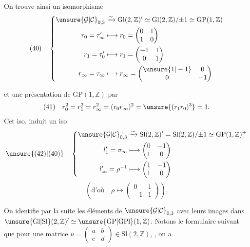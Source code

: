 On trouve ainsi un isomorphisme
\[
(40)\quad\left\{\begin{aligned}
\unsure{\mathcal{G}|\mathcal{C}}_{0,3}&\xrightarrow{\sim}\mathrm{Gl}(2,\mathbb Z)'\simeq
\mathrm{Gl}(2,\mathbb Z)/\mathord{\pm}1\simeq\mathrm{GP}(1,\mathbb Z)\\
r_0=\tau'_\infty&\longmapsto r_0=\begin{pmatrix}0&1\\1&0\end{pmatrix}\\
r_1=\tau'_0&\longmapsto r_1=\begin{pmatrix}-1&1\\0&1\end{pmatrix}\\
r_\infty=\tau_\infty&\longmapsto r_\infty=\begin{pmatrix}\unsure{1|-1}&0\\0&-1\end{pmatrix}
\end{aligned}\right.
\]

et une présentation de $\mathrm{GP}(1,\mathbb Z)$ par
\[
(41)\quad r_0^2=r_1^2=r_\infty^2=(r_0r_\infty)^2=\unsure{(r_1r_0)^3}=1.
\]
Cet iso. induit un iso
\[
\unsure{(42)|(40)}\quad\left\{\begin{aligned}
\unsure{\mathcal{G}|\mathcal{C}}_{0,3}^{+}&\xrightarrow{\sim}
\mathrm{Sl}(2,\mathbb Z)'=\mathrm{Sl}(2,\mathbb Z)/\mathord{\pm}1
\simeq\mathrm{GP}(1,\mathbb Z)^{+}\\
l'_1=\sigma_\infty&\longmapsto\begin{pmatrix}0&-1\\1&0\end{pmatrix}\\
l'_\infty=\rho^{-1}&\longmapsto\begin{pmatrix}1&-1\\1&0\end{pmatrix}
\end{aligned}\right.
\]
\[
(\text{d'où}\quad\rho\longmapsto\begin{pmatrix}0&1\\-1&1\end{pmatrix}).
\]

On identifie par la suite les éléments de $\unsure{\mathcal{G}|\mathcal{C}}_{0,3}$ avec leurs images dans
$\unsure{\mathrm{Gl}|\mathrm{Sl}}(2,\mathbb Z)'\simeq\unsure{\mathrm{GP}|\mathrm{GPl}}(1,\mathbb Z)$.
Notons le formulaire suivant  que pour une matrice
$u=\begin{pmatrix}a&b\\c&d\end{pmatrix}\in\mathrm{Sl}(2,\mathbb Z)$,
, on a

